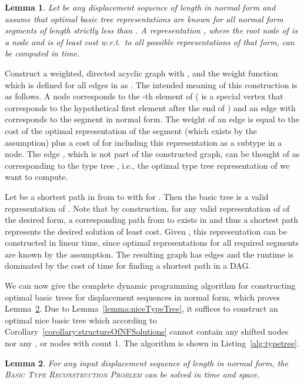 \documentclass[a4paper,11pt]{article}
\newtheorem{lemma}{Lemma}
\newenvironment{proof}{\par\noindent{\textsc{Proof:}}\space}{\protect\\ \par}
\begin{document}
\begin{lemma}
\label{lemma:strc}
Let  be any displacement sequence of length  in normal
form and assume that optimal basic tree representations are known for
all normal form segments of length strictly less than .  A
representation , where the root node of  is a 
node and  is of least cost w.r.t.\ to all possible
representations of that form, can be computed in  time.
\end{lemma}
\begin{proof}
Construct a weighted, directed acyclic graph  with ,  and the weight function  which is defined for all edges
 in  as .
The intended meaning of this construction is as follows.  A node 
corresponds to the -th element of  ( is a special
vertex that corresponds to the hypothetical first element after the
end of ) and an edge  with  corresponds to
the segment  in normal form.  The weight of an edge
 is equal to the cost of the optimal representation
 of the segment  (which exists by the
assumption) plus a cost of  for including this
representation as a subtype in a  node.  The edge ,
which is not part of the constructed graph, can be thought of as
corresponding to the type tree , i.e., the optimal type
tree representation of  we want to compute.

Let  be a shortest path in
 from  to  with  for .  Then
the basic tree  is a valid
representation of .  Note that by construction, for any valid
representation of  of the desired form, a corresponding path
from  to  exists in  and thus a shortest path represents
the desired solution of least cost.  Given , this representation
can be constructed in linear time, since optimal representations for
all required segments are known by the assumption.  The resulting
graph has  edges and the runtime is dominated by the cost
of  time for finding a shortest path in a DAG.
\end{proof}

We can now give the complete dynamic programming algorithm for
constructing optimal basic trees for displacement sequences in normal
form, which proves Lemma~\ref{lemma:optimalForNF}.  Due to
Lemma~\ref{lemma:niceTypeTree}, it suffices to construct an optimal
nice basic tree which according to
Corollary~\ref{corollary:structureOfNFSolutions} cannot contain any
shifted nodes nor any ,  or  nodes with count 1.
The algorithm is shown in Listing~\ref{alg:typetree}.

\begin{lemma}
\label{lemma:optimalForNF}
For any input displacement sequence  of length  in normal
form, the \textsc{Basic Type Reconstruction Problem} can be solved in
 time and  space.
\end{lemma}
\end{document}
